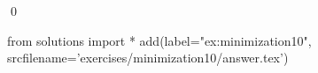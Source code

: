 
\begin{ex} 
  \label{ex:minimization10}
  
  \qed
\end{ex} 
\begin{python0}
from solutions import *
add(label="ex:minimization10",
    srcfilename='exercises/minimization10/answer.tex') 
\end{python0}
